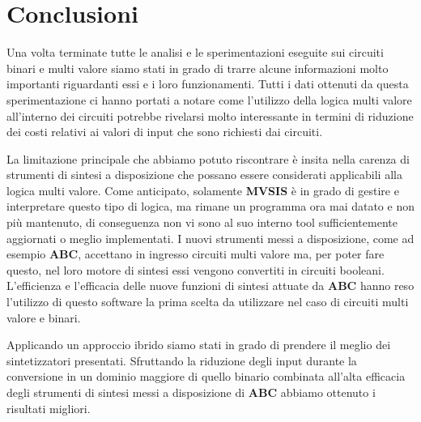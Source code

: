 \documentclass[
]{book}
\begin{document}
\hypertarget{conclusioni}{%
\chapter{Conclusioni}\label{conclusioni}}

Una volta terminate tutte le analisi e le sperimentazioni eseguite sui circuiti binari e multi valore siamo stati in grado di trarre alcune informazioni molto importanti riguardanti essi e i loro funzionamenti. Tutti i dati ottenuti da questa sperimentazione ci hanno portati a notare come l'utilizzo della logica multi valore all'interno dei circuiti potrebbe rivelarsi molto interessante in termini di riduzione dei costi relativi ai valori di input che sono richiesti dai circuiti.

La limitazione principale che abbiamo potuto riscontrare è insita nella carenza di strumenti di sintesi a disposizione che possano essere considerati applicabili alla logica multi valore. Come anticipato, solamente \textbf{MVSIS} è in grado di gestire e interpretare questo tipo di logica, ma rimane un programma ora mai datato e non più mantenuto, di conseguenza non vi sono al suo interno tool sufficientemente aggiornati o meglio implementati. I nuovi strumenti messi a disposizione, come ad esempio \textbf{ABC}, accettano in ingresso circuiti multi valore ma, per poter fare questo, nel loro motore di sintesi essi vengono convertiti in circuiti booleani. L'efficienza e l'efficacia delle nuove funzioni di sintesi attuate da \textbf{ABC} hanno reso l'utilizzo di questo software la prima scelta da utilizzare nel caso di circuiti multi valore e binari.

Applicando un approccio ibrido siamo stati in grado di prendere il meglio dei sintetizzatori presentati. Sfruttando la riduzione degli input durante la conversione in un dominio maggiore di quello binario combinata all'alta efficacia degli strumenti di sintesi messi a disposizione di \textbf{ABC} abbiamo ottenuto i risultati migliori.

\newpage
\end{document}
